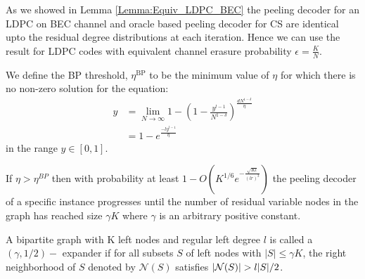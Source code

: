 \documentclass[conference,onecolumn]{IEEEtran}
\begin{document}
\begin{IEEEproof}
As we showed in Lemma \ref{Lemma:Equiv_LDPC_BEC} the peeling decoder for an LDPC on BEC channel and oracle based peeling decoder for CS are identical upto the residual degree distributions at each iteration. Hence we can use the result for LDPC codes \cite{richardson2008modern} with equivalent channel erasure probability $\epsilon=\frac{K}{N}$.
\end{IEEEproof}

\begin{definition}[BP Threshold]
We define the BP threshold, $\eta^{\text{BP}}$ to be the minimum value of $\eta$ for which there is no non-zero solution for the equation:
\begin{align*}
y&=\lim_{N\rightarrow\infty}1-\left(1-\frac{y^{l-1}}{N^{1-\delta}}\right)^{\frac{dN^{1-\delta}}{\eta}}\\
  &=1-e^{\frac{-ly^{l-1}}{\eta}}
\end{align*}
in the range $y\in [0,1]$.
\end{definition}


\begin{lemma}\cite{richardson2008modern}
\label{lem:PeelSmallGraph}
If $\eta>\eta^{BP}$ then with probability at least $1-O\left(K^{1/6}e^{-\frac{\sqrt{Kl}}{(lr)^3}}\right)$ the peeling decoder of a specific instance progresses until the number of residual variable nodes in the graph has reached size $\gamma K$ where $\gamma$ is an arbitrary positive constant.
\end{lemma}

\begin{definition}
\label{Def:ExpanderGraph}
A bipartite graph with K left nodes and regular left degree $l$ is called a $(\gamma,1/2)-$ expander if for all subsets $S$ of left nodes with $|S|\leq \gamma K$, the right neighborhood of $S$ denoted by $\mathcal{N}(S)$ satisfies $|\mc{N}(S)|>l|S|/2$.
\end{definition}
\end{document}
